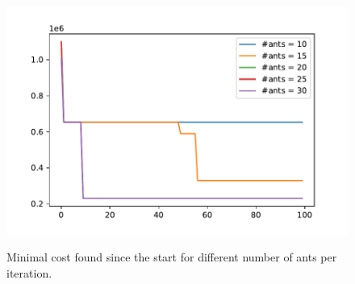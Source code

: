 \begin{figure}[h]
	\begin{centering}
		{\includegraphics[scale=0.7]{figures/experiments/plt_ant.pdf}}
		\caption[Parameter study: number of ants]{Minimal cost found since the start for different number of ants per iteration.}
		\label{fig:plt_ant}
	\end{centering}
\end{figure}
